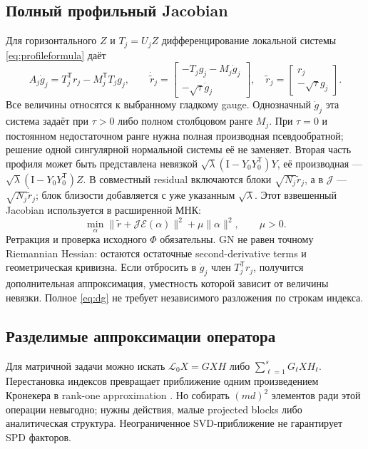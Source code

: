 \documentclass[11pt,a4paper]{article}
\newcommand{\Id}{\mathrm I}
\newcommand{\T}{^{\mathsf T}}
\begin{document}
\subsection{Полный профильный Jacobian}
Для горизонтального $Z$ и $T_j=U_jZ$ дифференцирование локальной
системы \eqref{eq:profileformula} даёт
\begin{equation}\label{eq:dg}
 A_j\dot g_j=T_j\T r_j-M_j\T T_jg_j,
 \qquad
 \dot{\tilde r}_j=
 \begin{bmatrix}-T_jg_j-M_j\dot g_j\\-\sqrt\tau\dot g_j\end{bmatrix},
 \quad\tilde r_j=\begin{bmatrix}r_j\\-\sqrt\tau g_j\end{bmatrix}.
\end{equation}
Все величины относятся к выбранному гладкому gauge.
Однозначный $\dot g_j$ эта система задаёт при $\tau>0$ либо полном
столбцовом ранге $M_j$. При $\tau=0$ и постоянном недостаточном ранге
нужна полная производная псевдообратной; решение одной сингулярной
нормальной системы её не заменяет.
Вторая часть профиля может быть представлена невязкой
$\sqrt\lambda(\Id-Y_0Y_0\T)Y$, её производная ---
$\sqrt\lambda(\Id-Y_0Y_0\T)Z$.
В совместный residual включаются блоки $\sqrt{N_j}\tilde r_j$,
а в $\mathcal J$ --- $\sqrt{N_j}\dot{\tilde r}_j$;
блок близости добавляется с уже указанным $\sqrt\lambda$.
Этот взвешенный Jacobian используется в расширенной МНК:
\begin{equation}\label{eq:gn}
 \min_\alpha\|
 \tilde r+\mathcal J\mathcal E(\alpha)\|^2+\mu\|\alpha\|^2,
 \qquad \mu>0.
\end{equation}
Ретракция и проверка исходного $\Phi$ обязательны.
GN не равен точному Riemannian Hessian: остаются остаточные
second-derivative terms и геометрическая кривизна.
Если отбросить в $\dot g_j$ член $T_j\T r_j$, получится дополнительная
аппроксимация, уместность которой зависит от величины невязки.
Полное \eqref{eq:dg} не требует независимого разложения по строкам индекса.

\subsection{Разделимые аппроксимации оператора}
Для матричной задачи можно искать
$\mathcal L_0X=GXH$ либо
$\sum_{\ell=1}^sG_\ell XH_\ell$.
Перестановка индексов превращает приближение одним произведением
Кронекера в rank-one approximation \cite{kron}.
Но собирать $(md)^2$ элементов ради этой операции невыгодно;
нужны действия, малые projected blocks либо аналитическая структура.
Неограниченное SVD-приближение не гарантирует SPD факторов.
\end{document}
